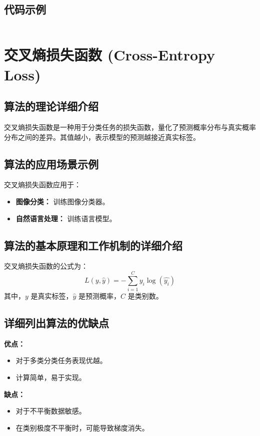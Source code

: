 \subsection*{代码示例}
\begin{lstlisting}

\end{lstlisting}


\section{交叉熵损失函数 (Cross-Entropy Loss)}
\subsection*{算法的理论详细介绍}
交叉熵损失函数是一种用于分类任务的损失函数，量化了预测概率分布与真实概率分布之间的差异。其值越小，表示模型的预测越接近真实标签。

\subsection*{算法的应用场景示例}
交叉熵损失函数应用于：
\begin{itemize}
    \item \textbf{图像分类：} 训练图像分类器。
    \item \textbf{自然语言处理：} 训练语言模型。
\end{itemize}

\subsection*{算法的基本原理和工作机制的详细介绍}
交叉熵损失函数的公式为：
\[
    L(y, \hat{y}) = -\sum_{i=1}^{C} y_i \log(\hat{y_i})
\]
其中，\(y\) 是真实标签，\(\hat{y}\) 是预测概率，\(C\) 是类别数。

\subsection*{详细列出算法的优缺点}
\textbf{优点：}
\begin{itemize}
    \item 对于多类分类任务表现优越。
    \item 计算简单，易于实现。
\end{itemize}

\textbf{缺点：}
\begin{itemize}
    \item 对于不平衡数据敏感。
    \item 在类别极度不平衡时，可能导致梯度消失。
\end{itemize}

